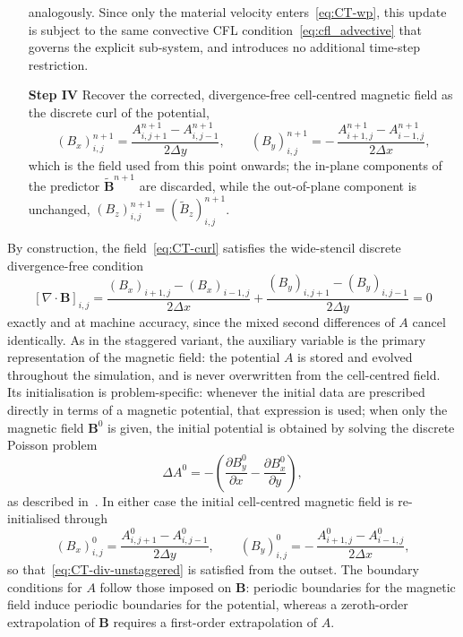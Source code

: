 \documentclass[a4paper,fleqn]{cas-sc}
\theoremstyle{definition}
\theoremstyle{remark}
\begin{document}
\begin{itemize}
      analogously. Since only the material velocity enters~\eqref{eq:CT-wp},
      this update is subject to the same convective CFL
      condition~\eqref{eq:cfl_advective} that governs the explicit sub-system, and
      introduces no additional time-step restriction.
\item[\textbf{Step IV}] Recover the corrected, divergence-free cell-centred
      magnetic field as the discrete curl of the potential,
      \begin{equation}
      \label{eq:CT-curl}
      (B_x)^{n+1}_{i,j} = \frac{A^{n+1}_{i,j+1}-A^{n+1}_{i,j-1}}{2\Delta y},
      \qquad
      (B_y)^{n+1}_{i,j} = -\,\frac{A^{n+1}_{i+1,j}-A^{n+1}_{i-1,j}}{2\Delta x},
      \end{equation}
      which is the field used from this point onwards; the in-plane components
      of the predictor $\tilde{\mathbf B}^{n+1}$ are discarded, while the
      out-of-plane component is unchanged,
      $(B_z)^{n+1}_{i,j}=(\tilde B_z)^{n+1}_{i,j}$.
\end{itemize}

By construction, the field~\eqref{eq:CT-curl} satisfies the wide-stencil
discrete divergence-free condition
%
\begin{equation}
\label{eq:CT-div-unstaggered}
[\nabla\cdot\mathbf B]_{i,j}
= \frac{(B_x)_{i+1,j}-(B_x)_{i-1,j}}{2\Delta x}
+ \frac{(B_y)_{i,j+1}-(B_y)_{i,j-1}}{2\Delta y} = 0
\end{equation}
%
exactly and at machine accuracy, since the mixed second differences of $A$
cancel identically. As in the staggered variant, the auxiliary variable is the
primary representation of the magnetic field: the potential $A$ is stored and
evolved throughout the simulation, and is never overwritten from the
cell-centred field. Its initialisation is problem-specific: whenever the initial
data are prescribed directly in terms of a magnetic potential, that expression
is used; when only the magnetic field $\mathbf B^0$ is given, the initial
potential is obtained by solving the discrete Poisson problem
%
\begin{equation}
\label{eq:CT-poisson}
\Delta A^{0} = -\left(\frac{\partial B^0_y}{\partial x}
                     -\frac{\partial B^0_x}{\partial y}\right),
\end{equation}
%
as described in~\cite{Rossmanith2006}. In either case the initial cell-centred
magnetic field is re-initialised through
%
\begin{equation}
\label{eq:CT-reinit}
(B_x)^{0}_{i,j} = \frac{A^{0}_{i,j+1}-A^{0}_{i,j-1}}{2\Delta y},
\qquad
(B_y)^{0}_{i,j} = -\,\frac{A^{0}_{i+1,j}-A^{0}_{i-1,j}}{2\Delta x},
\end{equation}
%
so that~\eqref{eq:CT-div-unstaggered} is satisfied from the outset. The
boundary conditions for $A$ follow those imposed on $\mathbf B$: periodic
boundaries for the magnetic field induce periodic boundaries for the potential,
whereas a zeroth-order extrapolation of $\mathbf B$ requires a first-order
extrapolation of $A$.
\end{document}
